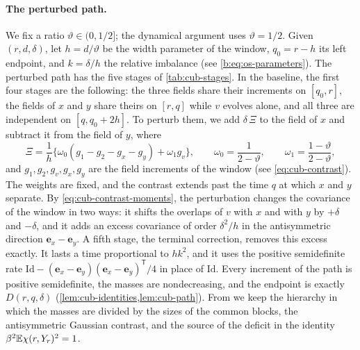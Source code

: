 \paragraph{The perturbed path.} We fix a ratio $\vartheta\in(0,1/2]$; the
dynamical argument uses $\vartheta=1/2$. Given $(r,d,\delta)$, let $h=d/\vartheta$
be the width parameter of the window, $q_0=r-h$ its left endpoint, and $k=\delta/h$ the
relative imbalance (see \eqref{b:eq:os-parameters}). The perturbed path has the five
stages of \cref{tab:cub-stages}. In the baseline, the first four stages are
the following: the three fields share their increments on $[q_0,r]$, the
fields of $x$ and $y$ share theirs on $[r,q]$ while $v$ evolves alone, and all
three are independent on $[q,q_0+2h]$. To perturb them, we add $\delta\,\Xi$ to the
field of $x$ and subtract it from the field of $y$, where
\[
 \Xi=\frac1h\bigl\{\omega_0(g_1-g_2-g_x-g_y)+\omega_1g_v\bigr\},\qquad
 \omega_0=\frac1{2-\vartheta},\qquad\omega_1=\frac{1-\vartheta}{2-\vartheta},
\]
and $g_1,g_2,g_v,g_x,g_y$ are the field increments of the window
(see \eqref{eq:cub-contrast}). The weights are fixed, and the contrast extends past
the time $q$ at which $x$ and $y$ separate. By \eqref{eq:cub-contrast-moments},
the perturbation changes the covariance of the window in two ways: it shifts
the overlaps of $v$ with $x$ and with $y$ by $+\delta$ and $-\delta$, and it
adds an excess covariance of order $\delta^2/h$ in the antisymmetric
direction $\mathbf e_x-\mathbf e_y$. A fifth
stage, the terminal correction, removes this excess exactly. It lasts a time
proportional to $hk^2$, and it uses the positive semidefinite rate
$\mathrm{Id}-(\mathbf e_x-\mathbf e_y)(\mathbf e_x-\mathbf e_y)^{\mathsf T}/4$ in place of
$\mathrm{Id}$. Every increment of the path is positive semidefinite, the masses are
nondecreasing, and the endpoint is exactly $D(r,q,\delta)$
(\cref{lem:cub-identities,lem:cub-path}). From
\cite[Section~7]{oai-barriers} we keep the hierarchy in which the masses are
divided by the sizes of the common blocks, the antisymmetric Gaussian
contrast, and the source of the deficit in the identity
$\beta^2\mathbb E\chi(r,Y_r)^2=1$.

